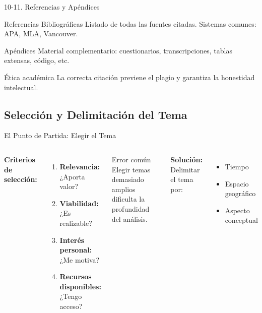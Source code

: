 \documentclass[xcolor=table,aspectratio=169,11pt]{beamer}
\begin{document}
	\begin{frame}{10-11. Referencias y Apéndices}
		\begin{block}{Referencias Bibliográficas}
			Listado de todas las fuentes citadas. Sistemas comunes: APA, MLA, Vancouver.
		\end{block}
		
		\vspace{0.3cm}
		
		\begin{block}{Apéndices}
			Material complementario: cuestionarios, transcripciones, tablas extensas, código, etc.
		\end{block}
		
		\vspace{0.3cm}
		\begin{alertblock}{Ética académica}
			La correcta citación previene el plagio y garantiza la honestidad intelectual.
		\end{alertblock}
	\end{frame}
	
	\subsection{Selección y Delimitación del Tema}
	
	\begin{frame}{El Punto de Partida: Elegir el Tema}
		\begin{columns}[T]
			\textbf{Criterios de selección:}
			\begin{enumerate}
				\item \textbf{Relevancia:} ¿Aporta valor?
				\item \textbf{Viabilidad:} ¿Es realizable?
				\item \textbf{Interés personal:} ¿Me motiva?
				\item \textbf{Recursos disponibles:} ¿Tengo acceso?
			\end{enumerate}
			
			\begin{alertblock}{Error común}
				Elegir temas demasiado amplios dificulta la profundidad del análisis.
			\end{alertblock}
			
			\textbf{Solución:} Delimitar el tema por:
			\begin{itemize}
				\item Tiempo
				\item Espacio geográfico
				\item Aspecto conceptual
			\end{itemize}
		\end{columns}
	\end{frame}
	
\end{document}
